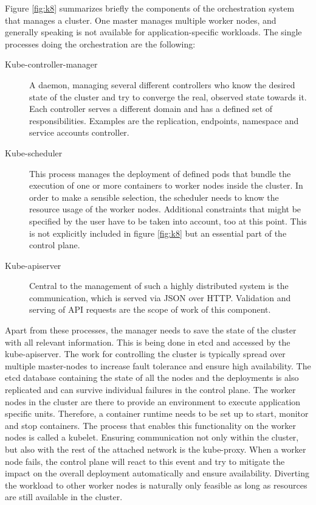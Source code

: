 Figure \ref{fig:k8} summarizes briefly the components of the orchestration system that manages a cluster. One master manages multiple worker nodes, and generally speaking is not available for application-specific workloads. The single processes doing the orchestration are the following:

\setlength{\leftmargini}{0pt} 
\begin{description}
	\item [Kube-controller-manager] A daemon, managing several different controllers who know the desired state of the cluster and try to converge the real, observed state towards it. Each controller serves a different domain and has a defined set of responsibilities. Examples are the replication, endpoints, namespace and service accounts controller.
	
	\item [Kube-scheduler] This process manages the deployment of defined pods that bundle the execution of one or more containers to worker nodes inside the cluster. In order to make a sensible selection, the scheduler needs to know the resource usage of the worker nodes. Additional constraints that might be specified by the user have to be taken into account, too at this point. This is not explicitly included in figure \ref{fig:k8} but an essential part of the control plane.
	
	\item [Kube-apiserver] Central to the management of such a highly distributed system is the communication, which is served via JSON over HTTP. Validation and serving of API requests are the scope of work of this component. 
\end{description}

Apart from these processes, the manager needs to save the state of the cluster with all relevant information. This is being done in etcd and accessed by the kube-apiserver. The work for controlling the cluster is typically spread over multiple master-nodes to increase fault tolerance and ensure high availability. The etcd database containing the state of all the nodes and the deployments is also replicated and can survive individual failures in the control plane. 
The worker nodes in the cluster are there to provide an environment to execute application specific units. Therefore, a container runtime needs to be set up to start, monitor and stop containers. The process that enables this functionality on the worker nodes is called a kubelet. Ensuring communication not only within the cluster, but also with the rest of the attached network is the kube-proxy. When a worker node fails, the control plane will react to this event and try to mitigate the impact on the overall deployment automatically and ensure availability. Diverting the workload to other worker nodes is naturally only feasible as long as resources are still available in the cluster.

